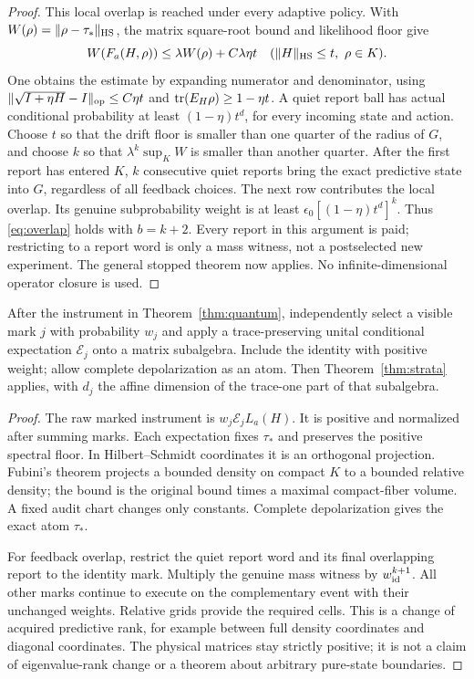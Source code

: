 \begin{proof}
This local overlap is reached under every adaptive policy. With $W(\rho)=\lVert\rho-\tau_*\rVert_{\mathrm{HS}}$, the matrix square-root bound and likelihood floor give
\[
 W(F_a(H,\rho))\le\lambda W(\rho)+C\lambda\eta t
 \quad(\lVert H\rVert_{\mathrm{HS}}\le t,\ \rho\in K).
\]
One obtains the estimate by expanding numerator and denominator, using $\lVert\sqrt{I+\eta H}-I\rVert_{\rm op}\le C\eta t$ and $\operatorname{tr}(E_H\rho)\ge1-\eta t$. A quiet report ball has actual conditional probability at least $(1-\eta)t^d$, for every incoming state and action. Choose $t$ so that the drift floor is smaller than one quarter of the radius of $G$, and choose $k$ so that $\lambda^k\sup_KW$ is smaller than another quarter. After the first report has entered $K$, $k$ consecutive quiet reports bring the exact predictive state into $G$, regardless of all feedback choices. The next row contributes the local overlap. Its genuine subprobability weight is at least $\epsilon_0[(1-\eta)t^d]^k$. Thus \eqref{eq:overlap} holds with $b=k+2$. Every report in this argument is paid; restricting to a report word is only a mass witness, not a postselected new experiment. The general stopped theorem now applies. No infinite-dimensional operator closure is used.
\end{proof}

\begin{corollary}\label{cor:rank}
After the instrument in Theorem~\ref{thm:quantum}, independently select a visible mark $j$ with probability $w_j$ and apply a trace-preserving unital conditional expectation $\mathcal E_j$ onto a matrix subalgebra. Include the identity with positive weight; allow complete depolarization as an atom. Then Theorem~\ref{thm:strata} applies, with $d_j$ the affine dimension of the trace-one part of that subalgebra.
\end{corollary}
\begin{proof}
The raw marked instrument is $w_j\mathcal E_jL_a(H)$. It is positive and normalized after summing marks. Each expectation fixes $\tau_*$ and preserves the positive spectral floor. In Hilbert--Schmidt coordinates it is an orthogonal projection. Fubini's theorem projects a bounded density on compact $K$ to a bounded relative density; the bound is the original bound times a maximal compact-fiber volume. A fixed audit chart changes only constants. Complete depolarization gives the exact atom $\tau_*$.

For feedback overlap, restrict the quiet report word and its final overlapping report to the identity mark. Multiply the genuine mass witness by $w_{\rm id}^{k+1}$. All other marks continue to execute on the complementary event with their unchanged weights. Relative grids provide the required cells. This is a change of acquired predictive rank, for example between full density coordinates and diagonal coordinates. The physical matrices stay strictly positive; it is not a claim of eigenvalue-rank change or a theorem about arbitrary pure-state boundaries.
\end{proof}
